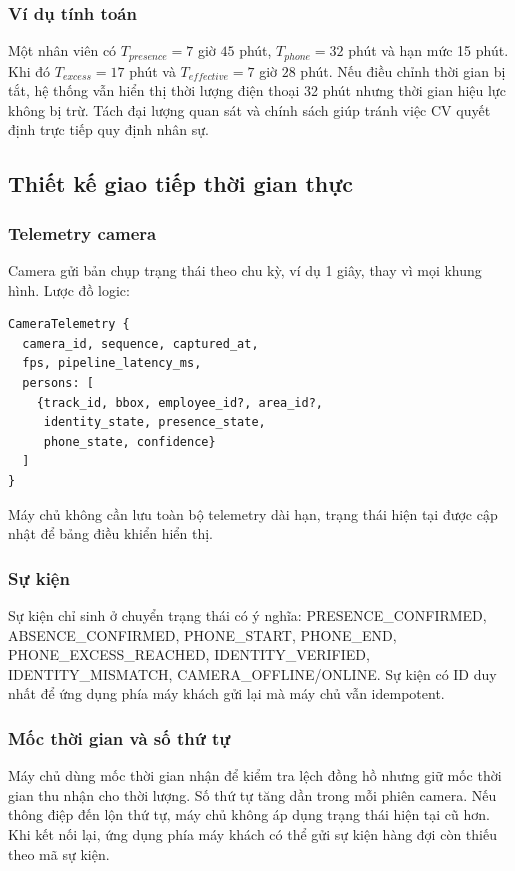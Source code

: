\subsubsection{Ví dụ tính toán}
Một nhân viên có $T_{presence}=7$ giờ $45$ phút, $T_{phone}=32$ phút và hạn mức 15 phút. Khi đó $T_{excess}=17$ phút và $T_{effective}=7$ giờ $28$ phút. Nếu điều chỉnh thời gian bị tắt, hệ thống vẫn hiển thị thời lượng điện thoại 32 phút nhưng thời gian hiệu lực không bị trừ. Tách đại lượng quan sát và chính sách giúp tránh việc CV quyết định trực tiếp quy định nhân sự.

\subsection{Thiết kế giao tiếp thời gian thực}
\subsubsection{Telemetry camera}
Camera gửi bản chụp trạng thái theo chu kỳ, ví dụ 1 giây, thay vì mọi khung hình. Lược đồ logic:
\begin{Verbatim}[fontsize=\small,breaklines=true,breakanywhere=true]
CameraTelemetry {
  camera_id, sequence, captured_at,
  fps, pipeline_latency_ms,
  persons: [
    {track_id, bbox, employee_id?, area_id?,
     identity_state, presence_state,
     phone_state, confidence}
  ]
}
\end{Verbatim}
Máy chủ không cần lưu toàn bộ telemetry dài hạn, trạng thái hiện tại được cập nhật để bảng điều khiển hiển thị.

\subsubsection{Sự kiện}
Sự kiện chỉ sinh ở chuyển trạng thái có ý nghĩa: PRESENCE\_CONFIRMED, ABSENCE\_CONFIRMED, PHONE\_START, PHONE\_END, PHONE\_EXCESS\_REACHED, IDENTITY\_VERIFIED, IDENTITY\_MISMATCH, CAMERA\_OFFLINE/ONLINE. Sự kiện có ID duy nhất để ứng dụng phía máy khách gửi lại mà máy chủ vẫn idempotent.

\subsubsection{Mốc thời gian và số thứ tự}
Máy chủ dùng mốc thời gian nhận để kiểm tra lệch đồng hồ nhưng giữ mốc thời gian thu nhận cho thời lượng. Số thứ tự tăng dần trong mỗi phiên camera. Nếu thông điệp đến lộn thứ tự, máy chủ không áp dụng trạng thái hiện tại cũ hơn. Khi kết nối lại, ứng dụng phía máy khách có thể gửi sự kiện hàng đợi còn thiếu theo mã sự kiện.

